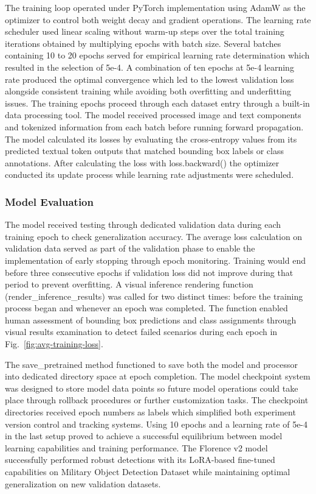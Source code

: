 \documentclass[fleqn,10pt,lineno]{wlpeerj}
\begin{document}
The training loop operated under PyTorch implementation using AdamW as the optimizer to control both weight decay and gradient operations. The learning rate scheduler used linear scaling without warm-up steps over the total training iterations obtained by multiplying epochs with batch size. Several batches containing 10 to 20 epochs served for empirical learning rate determination which resulted in the selection of 5e-4. A combination of ten epochs at 5e-4 learning rate produced the optimal convergence which led to the lowest validation loss alongside consistent training while avoiding both overfitting and underfitting issues. The training epochs proceed through each dataset entry through a built-in data processing tool. The model received processed image and text components and tokenized information from each batch before running forward propagation. The model calculated its losses by evaluating the cross-entropy values from its predicted textual token outputs that matched bounding box labels or class annotations. After calculating the loss with loss.backward() the optimizer conducted its update process while learning rate adjustments were scheduled.  

\subsubsection{Model Evaluation}

The model received testing through dedicated validation data during each training epoch to check generalization accuracy. The average loss calculation on validation data served as part of the validation phase to enable the implementation of early stopping through epoch monitoring. Training would end before three consecutive epochs if validation loss did not improve during that period to prevent overfitting. A visual inference rendering function (render\_inference\_results) was called for two distinct times: before the training process began and whenever an epoch was completed. The function enabled human assessment of bounding box predictions and class assignments through visual results examination to detect failed scenarios during each epoch in Fig.~\ref{fig:avg-training-loss}.  

The save\_pretrained method functioned to save both the model and processor into dedicated directory space at epoch completion. The model checkpoint system was designed to store model data points so future model operations could take place through rollback procedures or further customization tasks. The checkpoint directories received epoch numbers as labels which simplified both experiment version control and tracking systems. Using 10 epochs and a learning rate of 5e-4 in the last setup proved to achieve a successful equilibrium between model learning capabilities and training performance. The Florence v2 model successfully performed robust detections with its LoRA-based fine-tuned capabilities on Military Object Detection Dataset while maintaining optimal generalization on new validation datasets.  
\end{document}
